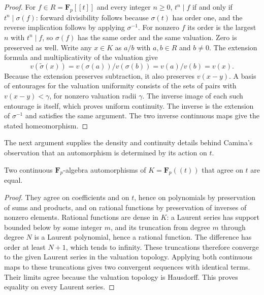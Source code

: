 \begin{proof}
For $f\in R=\mathbf F_p[[t]]$ and every integer $n\ge0$,
$t^n\mid f$ if and only if $t^n\mid\sigma(f)$: forward divisibility
follows because $\sigma(t)$ has order one, and the reverse implication
follows by applying $\sigma^{-1}$.
For nonzero $f$ its order is the largest $n$ with $t^n\mid f$,
so $\sigma(f)$ has the same order and the same valuation. Zero is
preserved as well. Write any $x\in K$ as $a/b$ with $a,b\in R$
and $b\ne0$. The extension formula and multiplicativity of the valuation
give
\[
 v(\widetilde\sigma(x))
 =v(\sigma(a))/v(\sigma(b))=v(a)/v(b)=v(x).
\]
Because the extension preserves subtraction, it also preserves
$v(x-y)$. A basis of entourages for the valuation uniformity consists
of the sets of pairs with $v(x-y)<\gamma$, for nonzero valuation
radii $\gamma$. The inverse image of each such entourage is itself,
which proves uniform continuity. The inverse is the extension of
$\sigma^{-1}$ and satisfies the same argument. The two inverse
continuous maps give the stated homeomorphism.
\end{proof}

The next argument supplies the density and continuity details behind
Camina's observation that an automorphism is determined by its action on $t$.

\begin{lemma}
\label{lem:laurent-aut-ext}
\leanok
Two continuous $\mathbf F_p$-algebra automorphisms of
$K=\mathbf F_p((t))$ that agree on $t$ are equal.
\end{lemma}

\begin{proof}
They agree on coefficients and on $t$, hence on polynomials by
preservation of sums and products, and on rational functions by
preservation of inverses of nonzero elements. Rational functions
are dense in $K$: a Laurent series has support bounded below by some
integer $m$, and its truncation from degree $m$ through degree $N$
is a Laurent polynomial, hence a rational function. The difference
has order at least $N+1$, which tends to infinity. These truncations
therefore converge to the given Laurent series in the valuation
topology. Applying both continuous maps to these truncations gives
two convergent sequences with identical terms. Their limits agree
because the valuation topology is Hausdorff. This proves equality
on every Laurent series.
\end{proof}

